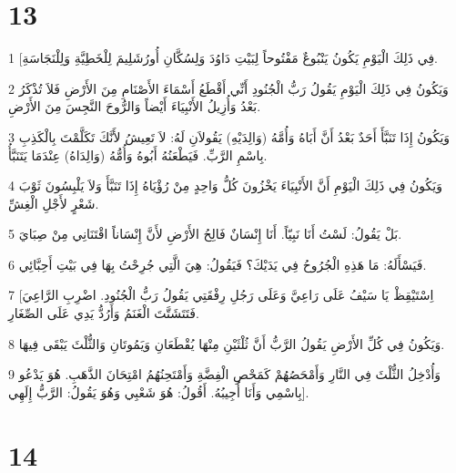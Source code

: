 \chapter{13}

\par 1 [فِي ذَلِكَ الْيَوْمِ يَكُونُ يَنْبُوعٌ مَفْتُوحاً لِبَيْتِ دَاوُدَ وَلِسُكَّانِ أُورُشَلِيمَ لِلْخَطِيَّةِ وَلِلْنَجَاسَةِ.
\par 2 وَيَكُونُ فِي ذَلِكَ الْيَوْمِ يَقُولُ رَبُّ الْجُنُودِ أَنِّي أَقْطَعُ أَسْمَاءَ الأَصْنَامِ مِنَ الأَرْضِ فَلاَ تُذْكَرُ بَعْدُ وَأُزِيلُ الأَنْبِيَاءَ أَيْضاً وَالرُّوحَ النَّجِسَ مِنَ الأَرْضِ.
\par 3 وَيَكُونُ إِذَا تَنَبَّأَ أَحَدٌ بَعْدُ أَنَّ أَبَاهُ وَأُمَّهُ (وَالِدَيْهِ) يَقُولاَنِ لَهُ: لاَ تَعِيشُ لأَنَّكَ تَكَلَّمْتَ بِالْكَذِبِ بِاسْمِ الرَّبِّ. فَيَطْعَنُهُ أَبُوهُ وَأُمُّهُ (وَالِدَاهُ) عِنْدَمَا يَتَنَبَّأُ.
\par 4 وَيَكُونُ فِي ذَلِكَ الْيَوْمِ أَنَّ الأَنْبِيَاءَ يَخْزُونَ كُلُّ وَاحِدٍ مِنْ رُؤْيَاهُ إِذَا تَنَبَّأَ وَلاَ يَلْبِسُونَ ثَوْبَ شَعْرٍ لأَجْلِ الْغِشِّ.
\par 5 بَلْ يَقُولُ: لَسْتُ أَنَا نَبِيّاً. أَنَا إِنْسَانٌ فَالِحُ الأَرْضِ لأَنَّ إِنْسَاناً اقْتَنَانِي مِنْ صِبَايَ.
\par 6 فَيَسْأَلَهُ: مَا هَذِهِ الْجُرُوحُ فِي يَدَيْكَ؟ فَيَقُولُ: هِيَ الَّتِي جُرِحْتُ بِهَا فِي بَيْتِ أَحِبَّائِي.
\par 7 [اِسْتَيْقِظْ يَا سَيْفُ عَلَى رَاعِيَّ وَعَلَى رَجُلِ رِفْقَتِي يَقُولُ رَبُّ الْجُنُودِ. اضْرِبِ الرَّاعِيَ فَتَتَشَتَّتَ الْغَنَمُ وَأَرُدُّ يَدِي عَلَى الصِّغَارِ.
\par 8 وَيَكُونُ فِي كُلِّ الأَرْضِ يَقُولُ الرَّبُّ أَنَّ ثُلْثَيْنِ مِنْهَا يُقْطَعَانِ وَيَمُوتَانِ وَالثُّلْثَ يَبْقَى فِيهَا.
\par 9 وَأُدْخِلُ الثُّلْثَ فِي النَّارِ وَأَمْحَصُهُمْ كَمَحْصِ الْفِضَّةِ وَأَمْتَحِنُهُمُ امْتِحَانَ الذَّهَبِ. هُوَ يَدْعُو بِاسْمِي وَأَنَا أُجِيبُهُ. أَقُولُ: هُوَ شَعْبِي وَهُوَ يَقُولُ: الرَّبُّ إِلَهِي].

\chapter{14}

